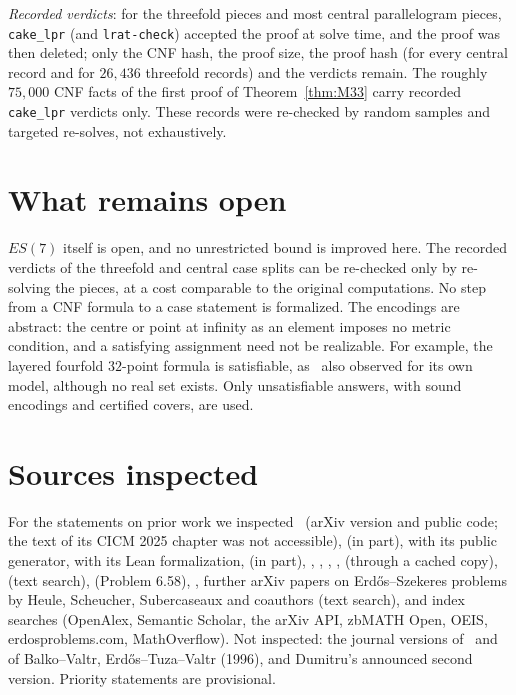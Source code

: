 \documentclass[11pt]{article}
\theoremstyle{remark}
\begin{document}
\emph{Recorded verdicts}: for the threefold pieces and most central parallelogram pieces, \texttt{cake\_lpr} (and
\texttt{lrat-check}) accepted the proof at solve time, and the proof was then deleted; only the CNF hash, the proof size, the proof hash (for every central
record and for $26{,}436$ threefold records) and the verdicts remain. The roughly $75{,}000$ CNF facts of the first proof
of Theorem~\ref{thm:M33} carry recorded \texttt{cake\_lpr} verdicts only. These records were re-checked by random
samples and targeted re-solves, not exhaustively.

\section{What remains open}
$ES(7)$ itself is open, and no unrestricted bound is improved here. The recorded verdicts of the threefold and central
case splits can be re-checked only by re-solving the pieces, at a cost comparable to the original computations. No step
from a CNF formula to a case statement is formalized. The encodings are abstract: the centre or point at infinity as an
element imposes no metric condition, and a satisfying assignment need not be realizable. For example, the layered
fourfold $32$-point formula is satisfiable, as~\cite{SMQH25} also observed for its own model, although no real set
exists. Only unsatisfiable answers, with sound encodings and certified covers, are used.

\section{Sources inspected}\label{sec:lit}
For the statements on prior work we inspected~\cite{SMQH25} (arXiv version and public code; the text of its CICM 2025
chapter was not accessible), \cite{Mac25} (in part), \cite{Dum25} with its public generator, \cite{Bae25} with its Lean
formalization, \cite{BB25} (in part), \cite{BV15}, \cite{MS00}, \cite{ES61}, \cite{KPH26}, \cite{ZLRO26} (through a cached
copy), \cite{Sch26} (text search), \cite{GGTW25} (Problem 6.58), \cite{KK26}, further arXiv papers on Erd\H{o}s--Szekeres
problems by Heule, Scheucher, Subercaseaux and coauthors (text search), and index searches (OpenAlex, Semantic Scholar,
the arXiv API, zbMATH Open, OEIS, erdosproblems.com, MathOverflow). Not inspected: the journal versions of~\cite{BB25}
and of Balko--Valtr, Erd\H{o}s--Tuza--Valtr (1996), and Dumitru's announced second version. Priority statements are
provisional.
\end{document}
